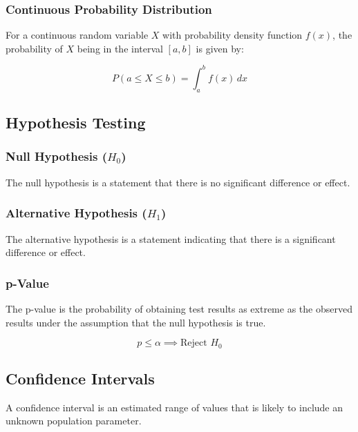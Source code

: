 \documentclass{article}
\begin{document}
\subsubsection{Continuous Probability Distribution}

For a continuous random variable $X$ with probability density function $f(x)$, the probability of $X$ being in the interval $[a, b]$ is given by:

\begin{equation}
    P(a \leq X \leq b) = \int_{a}^{b} f(x) \,dx
\end{equation}

\subsection{Hypothesis Testing}

\subsubsection{Null Hypothesis ($H_0$)}

The null hypothesis is a statement that there is no significant difference or effect.

\subsubsection{Alternative Hypothesis ($H_1$)}

The alternative hypothesis is a statement indicating that there is a significant difference or effect.

\subsubsection{p-Value}

The p-value is the probability of obtaining test results as extreme as the observed results under the assumption that the null hypothesis is true.

\begin{equation}
    p \leq \alpha \implies \text{Reject } H_0
\end{equation}

\subsection{Confidence Intervals}

A confidence interval is an estimated range of values that is likely to include an unknown population parameter.
\end{document}
